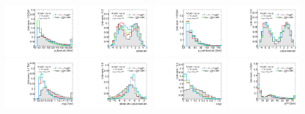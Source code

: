 \begin{figure}[tp]
  \centering
  \includegraphics[width=0.24\textwidth]{figures/overlaid/vbf/jet-1-pt}
  \includegraphics[width=0.24\textwidth]{figures/overlaid/vbf/jet-1-eta}
  \includegraphics[width=0.24\textwidth]{figures/overlaid/vbf/jet-2-pt} 
  \includegraphics[width=0.24\textwidth]{figures/overlaid/vbf/jet-2-eta} \\
  \includegraphics[width=0.24\textwidth]{figures/overlaid/vbf/dijet-m-veryhigh}
  \includegraphics[width=0.24\textwidth]{figures/overlaid/vbf/jets-etaprod}
  \includegraphics[width=0.24\textwidth]{figures/overlaid/vbf/jets-deta} 
  \includegraphics[width=0.24\textwidth]{figures/overlaid/vbf/system-pt} \\

\end{figure}
